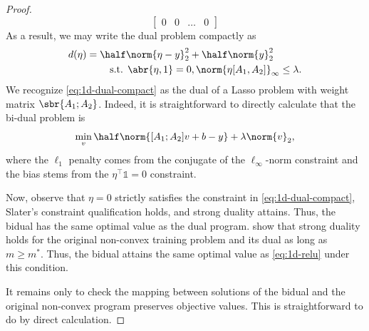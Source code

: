 \begin{proof}
\[\begin{bmatrix}
			0             & 0                 & \ldots & 0
		\end{bmatrix}
	\]
	As a result, we may write the dual problem compactly as
	\begin{equation}\label{eq:1d-dual-compact}
		\begin{aligned}
			d(\eta)
			 & =  \half \norm{\eta - y}_2^2 + \half \norm{y}^2_2                                         \\
			 & \hspace{2em} \text{ s.t. } \abr{\eta, 1} = 0, \norm{\eta [A_1, A_2]}_\infty \leq \lambda.
		\end{aligned}
	\end{equation}
	We recognize \cref{eq:1d-dual-compact} as the dual of a Lasso problem with
	weight matrix \( \sbr{A_1; A_2} \).
	Indeed, it is straightforward to directly calculate that the bi-dual problem is
	\begin{equation}
		\min_{v} \half \norm{[A_1; A_2] v + b - y} + \lambda \norm{v}_2,
	\end{equation}
	where the \( \ell_1 \) penalty comes from the conjugate of the \( \ell_\infty \)-norm
	constraint and the bias stems from the \( \eta^\top \mathds{1} = 0 \)
	constraint.

	Now, observe that \( \eta = 0 \) strictly satisfies the constraint in \cref{eq:1d-dual-compact},
	Slater's constraint qualification holds, and strong duality attains.
	Thus, the bidual has the same optimal value as the dual program.
	\citet{pilanci2020convexnn} show that strong duality holds for the
	original non-convex training problem and its dual as long as \( m \geq m^* \).
	Thus, the bidual attains the same optimal value as
	\cref{eq:1d-relu} under this condition.

	It remains only to check the mapping between solutions of the bidual and the original
	non-convex program preserves objective values.
	This is straightforward to do by direct calculation.
\end{proof}

